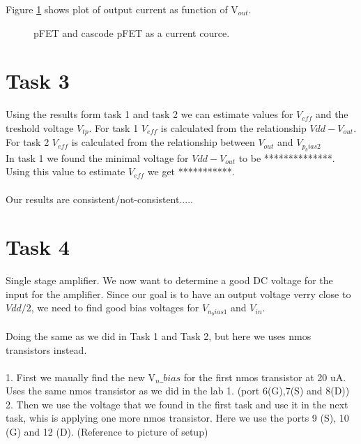 \documentclass[a4paper,english,11pt]{article}
\begin{document}
Figure \ref{fig:pfet-cascode-pfet} shows plot of output current as function of V$_{out}$.
\begin{figure}[htbp]
 \centering
  \caption{pFET and cascode pFET as a current cource.}
  \label{fig:pfet-cascode-pfet}	
\end{figure}

\section{Task 3}
Using the results form task 1 and task 2 we can estimate values for $V_{eff}$ and the treshold voltage $V_{tp}$.
For task 1 $V_{eff}$ is calculated from the relationship $Vdd - V_{out}$. For task 2 $V_{eff}$ is calculated from the relationship between $V_{out}$ and $V_{p_bias2}$
\\
In task 1 we found the minimal voltage for $Vdd - V_{out}$ to be **************. Using this value to estimate $V_{eff}$ we get ***********.\\
\\
Our results are consistent/not-consistent.....

\newpage
\section{Task 4}
Single stage amplifier.
We now want to determine a good DC voltage for the input for the amplifier. Since our goal is to have an output voltage verry close to $Vdd/2$, we need to find good bias voltages for $V_{n_bias1}$ and $V_{in}$.\\
\\
Doing the same as we did in Task 1 and Task 2, but here we uses nmos transistors instead.\\
\\
1. First we maually find the new V$_n\_bias$ for the first nmos transistor at 20 uA.\\
Uses the same nmos transistor as we did in the lab 1. (port 6(G),7(S) and 8(D))\\
2. Then we use the voltage that we found in the first task and use it in the next task, whis is applying one more nmos transistor. Here we
use the ports 9 (S), 10 (G) and 12 (D). (Reference to picture of setup)
\end{document}

